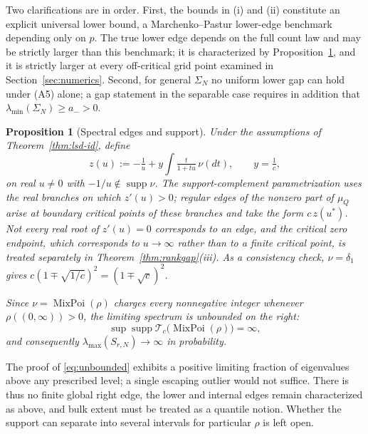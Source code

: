 \documentclass[lettersize,journal]{IEEEtran}
\newtheorem{prop}[theo]{Proposition}
\theoremstyle{remark}
\begin{document}
Two clarifications are in order. First, the bounds in (i) and (ii) constitute
an explicit universal lower bound, a Marchenko--Pastur lower-edge benchmark
depending only on $p$. The true lower edge depends on the full count law and
may be strictly larger than this benchmark; it is characterized by
Proposition~\ref{prop:edges}, and it is strictly larger at every off-critical
grid point examined in Section~\ref{sec:numerics}. Second, for general
$\Sigma_N$ no uniform lower gap can hold under (A5) alone; a gap statement in
the separable case requires in addition that
$\lambda_{\min}(\Sigma_N)\ge a_->0$.

\begin{prop}[Spectral edges and support\cite{benaych2009rectangular,bai1993limit}]
\label{prop:edges}
Under the assumptions of Theorem~\ref{thm:lsd-id}, define
\begin{equation}
  z(u):=-\tfrac1u+y\int\tfrac{t}{1+tu}\,\nu(dt),\qquad y=\tfrac1c,
  \label{eq:edge-map}
\end{equation}
on real $u\neq0$ with $-1/u\notin\operatorname{supp}\nu$. The
support-complement parametrization uses the real branches on which $z'(u)>0$;
regular edges of the nonzero part of $\mu_Q$ arise at boundary critical points
of these branches and take the form $c\,z(u^*)$. Not every real root of
$z'(u)=0$ corresponds to an edge, and the critical zero endpoint, which
corresponds to $u\to\infty$ rather than to a finite critical point, is treated
separately in Theorem~\ref{thm:rankgap}(iii). As a consistency check,
$\nu=\delta_1$ gives $c(1\mp\sqrt{1/c})^2=(1\mp\sqrt c)^2$.

Since $\nu=\operatorname{MixPoi}(\rho)$ charges every nonnegative integer
whenever $\rho((0,\infty))>0$, the limiting spectrum is unbounded on the
right:
\begin{equation}
  \sup\operatorname{supp}\mathcal{T}_c\big(\operatorname{MixPoi}(\rho)\big)
    =\infty,
  \label{eq:unbounded}
\end{equation}
and consequently $\lambda_{\max}(S_{r,N})\to\infty$ in probability.
\end{prop}

The proof of \eqref{eq:unbounded} exhibits a positive limiting fraction of
eigenvalues above any prescribed level; a single escaping outlier would not
suffice. There is thus no finite global right edge, the lower and internal
edges remain characterized as above, and bulk extent must be treated as a
quantile notion. Whether the support can separate into several intervals for
particular $\rho$ is left open.
\end{document}
